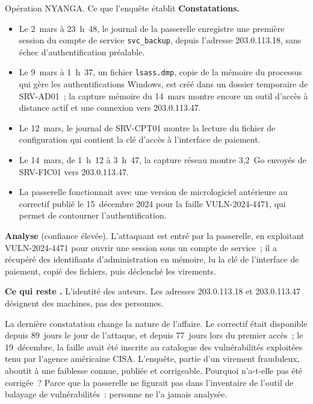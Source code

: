 \begin{boxscenario}{Opération NYANGA. Ce que l'enquête établit}
\textbf{Constatations.}
\begin{itemize}
    \item Le 2~mars à 23~h~48, le journal de la passerelle enregistre une
          première session du compte de service \texttt{svc\_backup}, depuis
          l'adresse 203.0.113.18, sans échec d'authentification préalable.
    \item Le 9~mars à 1~h~37, un fichier \texttt{lsass.dmp}, copie de la
          mémoire du processus qui gère les authentifications Windows, est
          créé dans un dossier temporaire de SRV-AD01~; la capture mémoire
          du 14~mars montre encore un outil d'accès à distance actif et une
          connexion vers 203.0.113.47.
    \item Le 12~mars, le journal de SRV-CPT01 montre la lecture du fichier
          de configuration qui contient la clé d'accès à l'interface de
          paiement.
    \item Le 14~mars, de 1~h~12 à 3~h~47, la capture réseau montre 3,2~Go
          envoyés de SRV-FIC01 vers 203.0.113.47.
    \item La passerelle fonctionnait avec une version de micrologiciel
          antérieure au correctif publié le 15~décembre 2024 pour la faille
          VULN-2024-4471, qui permet de contourner l'authentification.
\end{itemize}

\textbf{Analyse} (confiance élevée). L'attaquant est entré par la
passerelle, en exploitant VULN-2024-4471 pour ouvrir une session sous un
compte de service~; il a récupéré des identifiants d'administration en
mémoire, lu la clé de l'interface de paiement, copié des fichiers, puis
déclenché les virements.

\textbf{Ce qui reste \NEK{}.} L'identité des auteurs. Les adresses
203.0.113.18 et 203.0.113.47 désignent des machines, pas des personnes.
\end{boxscenario}

La dernière constatation change la nature de l'affaire. Le correctif était
disponible depuis 89~jours le jour de l'attaque, et depuis 77~jours lors du
premier accès~; le 19~décembre, la faille avait été inscrite au catalogue
des vulnérabilités exploitées tenu par l'agence américaine CISA. L'enquête,
partie d'un virement frauduleux, aboutit à une faiblesse connue, publiée et
corrigeable. Pourquoi n'a-t-elle pas été corrigée~? Parce que la passerelle
ne figurait pas dans l'inventaire de l'outil de balayage de vulnérabilités~:
personne ne l'a jamais analysée.

